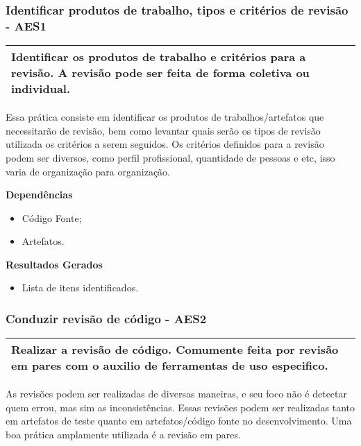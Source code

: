 \subsubsection{Identificar produtos de trabalho, tipos e critérios de revisão - AES1}
\label{sec:aes1}

\begin{table}[!ht]
\centering
\begin{tabular}{|p{130mm}|}
\hline
Identificar os produtos de trabalho e critérios para a revisão. A revisão pode ser feita de forma coletiva ou individual. \\ 
\hline
\end{tabular}
\end{table}

Essa prática consiste em identificar os produtos de trabalhos/artefatos que necessitarão de revisão, bem como levantar quais serão os tipos de revisão utilizada os critérios a serem seguidos. Os critérios definidos para a revisão podem ser diversos, como perfil profissional, quantidade de pessoas e etc, isso varia de organização para organização.

\textbf{Dependências}
\begin{itemize}
    \item Código Fonte;
    \item Artefatos.
\end{itemize}


\textbf{Resultados Gerados}
\begin{itemize}
    \item Lista de itens identificados.
\end{itemize}

\subsubsection{Conduzir revisão de código - AES2}
\label{sec:aes2}

\begin{table}[!ht]
\centering
\begin{tabular}{|p{130mm}|}
\hline
Realizar a revisão de código. Comumente feita por revisão em pares com o auxilio de ferramentas de uso especifico. \\
\hline
\end{tabular}
\end{table}

As revisões podem ser realizadas de diversas maneiras, e seu foco não é detectar quem errou, mas sim as inconsistências. Essas revisões podem ser realizadas tanto em artefatos de teste quanto em artefatos/código fonte no desenvolvimento. Uma boa prática amplamente utilizada é a revisão em pares.


